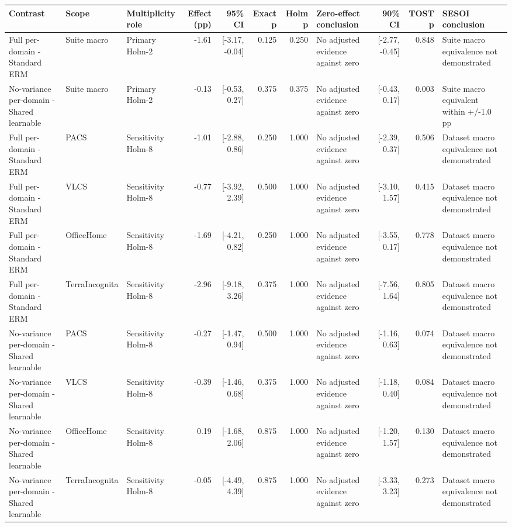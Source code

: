 \begin{tabular}{llp{2.2cm}rrrrp{3.0cm}rrp{3.5cm}}
\toprule
Contrast & Scope & Multiplicity role & Effect (pp) & 95\% CI & Exact p & Holm p & Zero-effect conclusion & 90\% CI & TOST p & SESOI conclusion \\
\midrule
Full per-domain - Standard ERM & Suite macro & Primary Holm-2 & -1.61 & [-3.17, -0.04] & 0.125 & 0.250 & No adjusted evidence against zero & [-2.77, -0.45] & 0.848 & Suite macro equivalence not demonstrated \\
No-variance per-domain - Shared learnable & Suite macro & Primary Holm-2 & -0.13 & [-0.53, 0.27] & 0.375 & 0.375 & No adjusted evidence against zero & [-0.43, 0.17] & 0.003 & Suite macro equivalent within +/-1.0 pp \\
Full per-domain - Standard ERM & PACS & Sensitivity Holm-8 & -1.01 & [-2.88, 0.86] & 0.250 & 1.000 & No adjusted evidence against zero & [-2.39, 0.37] & 0.506 & Dataset macro equivalence not demonstrated \\
Full per-domain - Standard ERM & VLCS & Sensitivity Holm-8 & -0.77 & [-3.92, 2.39] & 0.500 & 1.000 & No adjusted evidence against zero & [-3.10, 1.57] & 0.415 & Dataset macro equivalence not demonstrated \\
Full per-domain - Standard ERM & OfficeHome & Sensitivity Holm-8 & -1.69 & [-4.21, 0.82] & 0.250 & 1.000 & No adjusted evidence against zero & [-3.55, 0.17] & 0.778 & Dataset macro equivalence not demonstrated \\
Full per-domain - Standard ERM & TerraIncognita & Sensitivity Holm-8 & -2.96 & [-9.18, 3.26] & 0.375 & 1.000 & No adjusted evidence against zero & [-7.56, 1.64] & 0.805 & Dataset macro equivalence not demonstrated \\
No-variance per-domain - Shared learnable & PACS & Sensitivity Holm-8 & -0.27 & [-1.47, 0.94] & 0.500 & 1.000 & No adjusted evidence against zero & [-1.16, 0.63] & 0.074 & Dataset macro equivalence not demonstrated \\
No-variance per-domain - Shared learnable & VLCS & Sensitivity Holm-8 & -0.39 & [-1.46, 0.68] & 0.375 & 1.000 & No adjusted evidence against zero & [-1.18, 0.40] & 0.084 & Dataset macro equivalence not demonstrated \\
No-variance per-domain - Shared learnable & OfficeHome & Sensitivity Holm-8 & 0.19 & [-1.68, 2.06] & 0.875 & 1.000 & No adjusted evidence against zero & [-1.20, 1.57] & 0.130 & Dataset macro equivalence not demonstrated \\
No-variance per-domain - Shared learnable & TerraIncognita & Sensitivity Holm-8 & -0.05 & [-4.49, 4.39] & 0.875 & 1.000 & No adjusted evidence against zero & [-3.33, 3.23] & 0.273 & Dataset macro equivalence not demonstrated \\
\bottomrule
\end{tabular}
